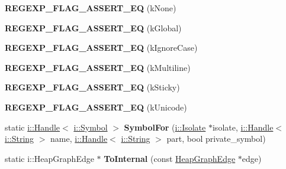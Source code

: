 \begin{DoxyCompactItemize}
\item 
{\bfseries R\+E\+G\+E\+X\+P\+\_\+\+F\+L\+A\+G\+\_\+\+A\+S\+S\+E\+R\+T\+\_\+\+EQ} (k\+None)\hypertarget{namespacev8_a8a08d76ad777282f9482658235f5209a}{}\label{namespacev8_a8a08d76ad777282f9482658235f5209a}

\item 
{\bfseries R\+E\+G\+E\+X\+P\+\_\+\+F\+L\+A\+G\+\_\+\+A\+S\+S\+E\+R\+T\+\_\+\+EQ} (k\+Global)\hypertarget{namespacev8_a8ab96ef7b8a36fa3e069c81c128a6cb7}{}\label{namespacev8_a8ab96ef7b8a36fa3e069c81c128a6cb7}

\item 
{\bfseries R\+E\+G\+E\+X\+P\+\_\+\+F\+L\+A\+G\+\_\+\+A\+S\+S\+E\+R\+T\+\_\+\+EQ} (k\+Ignore\+Case)\hypertarget{namespacev8_ac0145e0ba5074b759e96df7a01051cbe}{}\label{namespacev8_ac0145e0ba5074b759e96df7a01051cbe}

\item 
{\bfseries R\+E\+G\+E\+X\+P\+\_\+\+F\+L\+A\+G\+\_\+\+A\+S\+S\+E\+R\+T\+\_\+\+EQ} (k\+Multiline)\hypertarget{namespacev8_ad7c4bff176fa0251caf22607a9280dd6}{}\label{namespacev8_ad7c4bff176fa0251caf22607a9280dd6}

\item 
{\bfseries R\+E\+G\+E\+X\+P\+\_\+\+F\+L\+A\+G\+\_\+\+A\+S\+S\+E\+R\+T\+\_\+\+EQ} (k\+Sticky)\hypertarget{namespacev8_a671d3cd55030dd0b4b94f6e31441b810}{}\label{namespacev8_a671d3cd55030dd0b4b94f6e31441b810}

\item 
{\bfseries R\+E\+G\+E\+X\+P\+\_\+\+F\+L\+A\+G\+\_\+\+A\+S\+S\+E\+R\+T\+\_\+\+EQ} (k\+Unicode)\hypertarget{namespacev8_a443c7f18c53e23476315c3fe7b57bb4d}{}\label{namespacev8_a443c7f18c53e23476315c3fe7b57bb4d}

\item 
static \hyperlink{classv8_1_1internal_1_1_handle}{i\+::\+Handle}$<$ \hyperlink{classv8_1_1internal_1_1_symbol}{i\+::\+Symbol} $>$ {\bfseries Symbol\+For} (\hyperlink{classv8_1_1internal_1_1_isolate}{i\+::\+Isolate} $\ast$isolate, \hyperlink{classv8_1_1internal_1_1_handle}{i\+::\+Handle}$<$ \hyperlink{classv8_1_1internal_1_1_string}{i\+::\+String} $>$ name, \hyperlink{classv8_1_1internal_1_1_handle}{i\+::\+Handle}$<$ \hyperlink{classv8_1_1internal_1_1_string}{i\+::\+String} $>$ part, bool private\+\_\+symbol)\hypertarget{namespacev8_a32af4a61da33b651ad74fb36574493d4}{}\label{namespacev8_a32af4a61da33b651ad74fb36574493d4}

\item 
static i\+::\+Heap\+Graph\+Edge $\ast$ {\bfseries To\+Internal} (const \hyperlink{classv8_1_1_heap_graph_edge}{Heap\+Graph\+Edge} $\ast$edge)\hypertarget{namespacev8_aa9f0eb9ea4d6551f0e3c7c40f535812a}{}\label{namespacev8_aa9f0eb9ea4d6551f0e3c7c40f535812a}


\end{DoxyCompactItemize}
